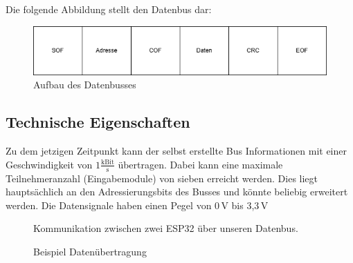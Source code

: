 Die folgende Abbildung stellt den Datenbus dar:
\begin{figure}[H]
	\centering    
	\includegraphics[width=1\textwidth]{Bilder/datenbus.png}
	\caption{Aufbau des Datenbusses}
	\label{Datenbus}
\end{figure}

\subsection{Technische Eigenschaften}
Zu dem jetzigen Zeitpunkt kann der selbst erstellte Bus Informationen mit einer Geschwindigkeit von $1\frac{\mathrm{kBit}}{\mathrm{s}}$ übertragen. Dabei kann eine maximale Teilnehmeranzahl (Eingabemodule) von sieben erreicht werden. Dies liegt hauptsächlich an den Adressierungsbits des Busses und könnte beliebig erweitert werden. Die Datensignale haben einen Pegel von 0\,\si{V} bis 3,3\,\si{V}

\begin{figure}[H]
    \centering    
    \caption{Kommunikation zwischen zwei ESP32 über unseren Datenbus.}
    \label{zeitplan}
\end{figure}

\begin{figure}[H]
    \centering    
    \caption{Beispiel Datenübertragung}
    \label{beispielDatenübertragung}
\end{figure}